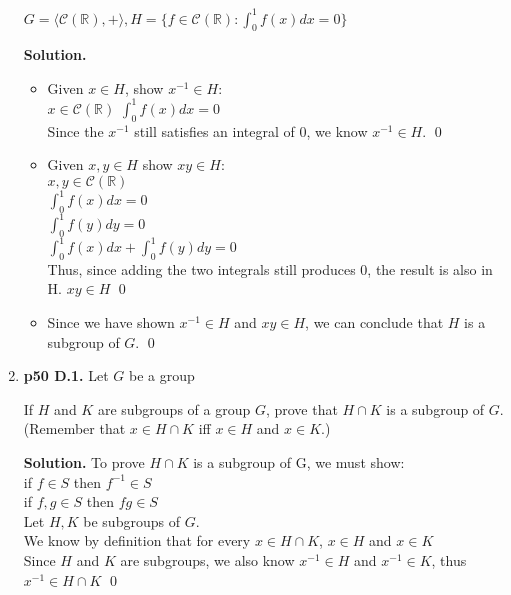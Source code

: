 \documentclass[11pt]{article}
\begin{document}
\begin{enumerate}
  $G = \langle \mathscr{C}(\mathbb{R}),+\rangle, H = \{f \in \mathscr{C}(\mathbb{R}) : \int_{0}^{1} f(x) dx = 0\}$
  
  {\bfseries Solution.}
  
  \begin{itemize}
  
	  \item Given $x \in H$, show $x^{-1} \in H$: \\
	  $x \in \mathscr{C}(\mathbb{R})$
	  $\int_{0}^{1} f(x) dx = 0$ \\
	  Since the $x^{-1}$ still satisfies an integral of 0, we know $x^{-1} \in H$. \qed \\
	  
	  \item Given $x,y \in H$ show $xy \in H$: \\
	  $x,y \in \mathscr{C}(\mathbb{R})$ \\
	  $\int_{0}^{1} f(x) dx = 0$ \\
	  $\int_{0}^{1} f(y) dy = 0$ \\
	  $\int_{0}^{1} f(x) dx + \int_{0}^{1} f(y) dy = 0$ \\
	  Thus, since adding the two integrals still produces 0, the result is also in H. $xy \in H$ \qed \\
	  
	  \item Since we have shown $x^{-1} \in H$ and $xy \in H$, we can conclude that $H$ is a subgroup of $G$. \qed
  
  \end{itemize}
 
\newpage
 
\item {\bfseries p50 D.1.} Let $G$ be a group
  
  If $H$ and $K$ are subgroups of a group $G$, prove that $H \cap K$ is a subgroup of $G$. (Remember that $x \in H \cap K$ iff $x \in H$ and $x \in K$.)
  
  {\bfseries Solution.} To prove $H \cap K$ is a subgroup of G, we must show: \\
  if $f \in S$ then $f^{-1} \in S$ \\
  if $f,g \in S$ then $fg \in S$ \\
  
  Let $H, K$ be subgroups of $G$. \\
  We know by definition that for every $x \in H \cap K$, $x \in H$ and $x \in K$ \\
  Since $H$ and $K$ are subgroups, we also know $x^{-1} \in H$ and $x^{-1} \in K$, thus $x^{-1} \in H \cap K$ \qed \\
  

\end{enumerate}
\end{document}

